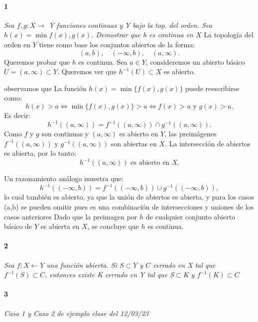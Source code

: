 \documentclass[12pt]{article}
\author{Alumnos: \\Arturo Rodriguez Contreras - 2132880 \\
Jonathan Raymundo Torres Cardenas - 1949731\\
Praxedis Jimenes Ruvalcaba \\
Erick Román Montemayor Treviño - 1957959 \\
Alexis Noe Mora Leyva \\
Everardo Flores Rivera - 2127301}
\begin{document}
\maketitle

\paragraph{1}
\textit{Sea $f,g:X\rightarrow$ Y funciones continuas y Y bajo la top. del orden. Sea $h(x)=\min{f(x),g(x)}$. Demostrar que h es continua en $X$}
La topología del orden en \( Y \) tiene como base los conjuntos abiertos de la forma:
\[
(a, b),\quad (-\infty, b),\quad (a, \infty).
\]
Queremos probar que \( h \) es continua.  
Sea \( a \in Y \), consideremos un abierto básico \( U = (a, \infty) \subset Y \).  
Queremos ver que \( h^{-1}(U) \subset X \) es abierto.

observamos que
La función \( h(x) = \min\{f(x), g(x)\} \) puede reescribirse como:
\[
h(x) > a \iff \min\{f(x), g(x)\} > a \iff f(x) > a \text{ y } g(x) > a.
\]
Es decir:
\[
h^{-1}((a, \infty)) = f^{-1}((a, \infty)) \cap g^{-1}((a, \infty)).
\]
Como \( f \) y \( g \) son continuas y \( (a, \infty) \) es abierto en \( Y \), las preimágenes \( f^{-1}((a, \infty)) \) y \( g^{-1}((a, \infty)) \) son abiertas en \( X \).  
La intersección de abiertos es abierta, por lo tanto:
\[
h^{-1}((a, \infty)) \text{ es abierto en } X.
\]

Un razonamiento análogo muestra que:
\[
h^{-1}((-\infty, b)) = f^{-1}((-\infty, b)) \cup g^{-1}((-\infty, b)),
\]
lo cual también es abierto, ya que la unión de abiertos es abierta, y para los casos  (a,b) se pueden omitir pues es una combinación de intersecciones y uniones de los casos anteriores    
Dado que la preimagen por \( h \) de cualquier conjunto abierto básico de \( Y \) es abierta en \( X \), se concluye que \( h \) es continua.

\paragraph{2}
\textit{Sea $f:X\leftarrow Y$ una función abierta. Si $S \subset Y$ y $C$ cerrado en X tal que $f^{-1}(S)\subset C$, entonces existe K cerrado en Y tal que S$\subset$K y $f^{-1}(K)\subset C$}

\paragraph{3}
\textit{Caso 1 y Caso 2 de ejemplo clase del 12/03/23} 
\end{document}
